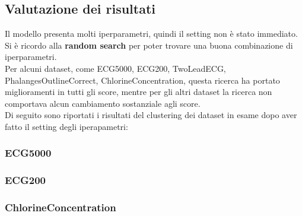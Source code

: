 \subsection{Valutazione dei risultati}
Il modello presenta molti iperparametri, quindi il setting non è stato immediato. Si è ricordo alla \textbf{random search} per poter trovare una buona combinazione di iperparametri.\\
Per alcuni dataset, come ECG5000, ECG200, TwoLeadECG, PhalangesOutlineCorrect, ChlorineConcentration, questa ricerca ha portato miglioramenti in tutti gli score, mentre per gli altri dataset la ricerca non comportava alcun cambiamento sostanziale agli score.\\
Di seguito sono riportati i risultati del clustering dei dataset in esame dopo aver fatto il setting degli iperapametri:

\subsubsection{ECG5000}
\begin{center}
\end{center}

\subsubsection{ECG200}
\begin{center}
\end{center}

\subsubsection{ChlorineConcentration}
\begin{center}
\end{center}


